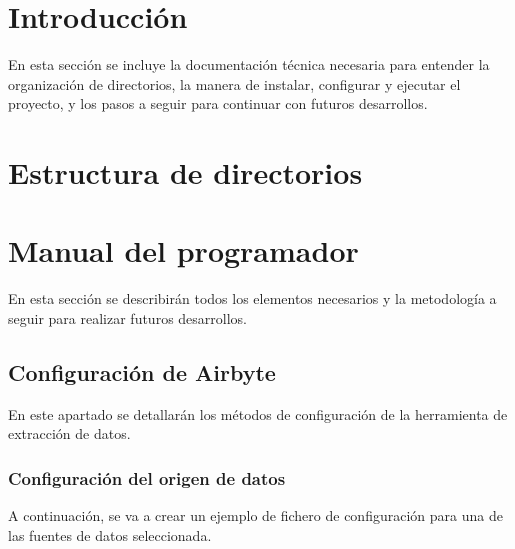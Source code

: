 
\section{Introducción}

En esta sección se incluye la documentación técnica necesaria para entender la organización de directorios, la manera de instalar, configurar y ejecutar el proyecto, y los pasos a seguir para continuar con futuros desarrollos.


\section{Estructura de directorios}

\section{Manual del programador}

En esta sección se describirán todos los elementos necesarios y la metodología a seguir para realizar futuros desarrollos.

\subsection{Configuración de Airbyte}

En este apartado se detallarán los métodos de configuración de la herramienta de extracción de datos.

\subsubsection{Configuración del origen de datos}

A continuación, se va a crear un ejemplo de fichero de configuración para una de las fuentes de datos seleccionada.

